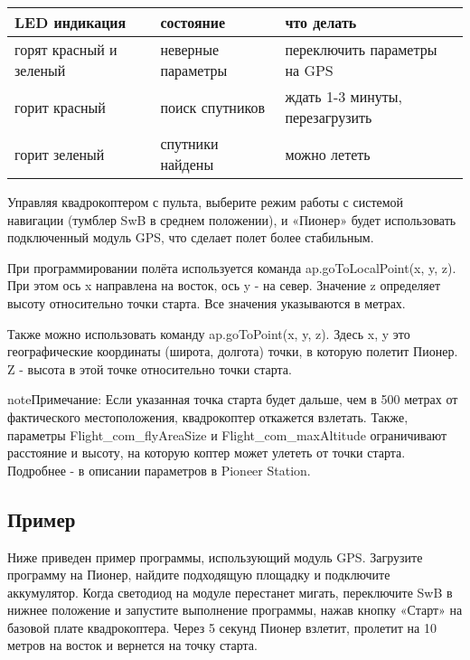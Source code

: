 \documentclass[a4paper,10pt,russian]{sphinxmanual}
\begin{document}
\begin{savenotes}\sphinxattablestart
\centering
\begin{tabulary}{\linewidth}[t]{|T|T|T|}
\hline
\sphinxstyletheadfamily 
LED индикация
&\sphinxstyletheadfamily 
состояние
&\sphinxstyletheadfamily 
что делать
\\
\hline
горят красный и зеленый
&
неверные параметры
&
переключить параметры на GPS
\\
\hline
горит красный
&
поиск спутников
&
ждать 1-3 минуты, перезагрузить
\\
\hline
горит зеленый
&
спутники найдены
&
можно лететь
\\
\hline
\end{tabulary}
\par
\sphinxattableend\end{savenotes}

Управляя квадрокоптером с пульта, выберите режим работы с системой навигации (тумблер SwB в среднем положении), и «Пионер» будет использовать подключенный модуль GPS, что сделает полет более стабильным.

При программировании полёта используется команда ap.goToLocalPoint(x, y, z). При этом ось x направлена на восток, ось y - на север. Значение z определяет высоту относительно точки старта. Все значения указываются в метрах.


Также можно использовать команду ap.goToPoint(x, y, z). Здесь x, y это географические координаты (широта, долгота) точки, в которую полетит Пионер. Z - высота в этой точке относительно точки старта.

\begin{sphinxadmonition}{note}{Примечание:}
Если указанная точка старта будет дальше, чем в 500 метрах от фактического местоположения, квадрокоптер откажется взлетать. Также, параметры Flight\_com\_flyAreaSize и Flight\_com\_maxAltitude ограничивают расстояние и высоту, на которую коптер может улететь от точки старта. Подробнее - в описании параметров в Pioneer Station.
\end{sphinxadmonition}


\subsection{Пример}
\label{\detokenize{module/gps:id1}}
Ниже приведен пример программы, использующий модуль GPS. Загрузите программу на Пионер, найдите подходящую площадку и подключите аккумулятор. Когда светодиод на модуле перестанет мигать, переключите SwB в нижнее положение и запустите выполнение программы, нажав кнопку «Старт» на базовой плате квадрокоптера. Через 5 секунд Пионер взлетит, пролетит на 10 метров на восток и вернется на точку старта.
\end{document}
